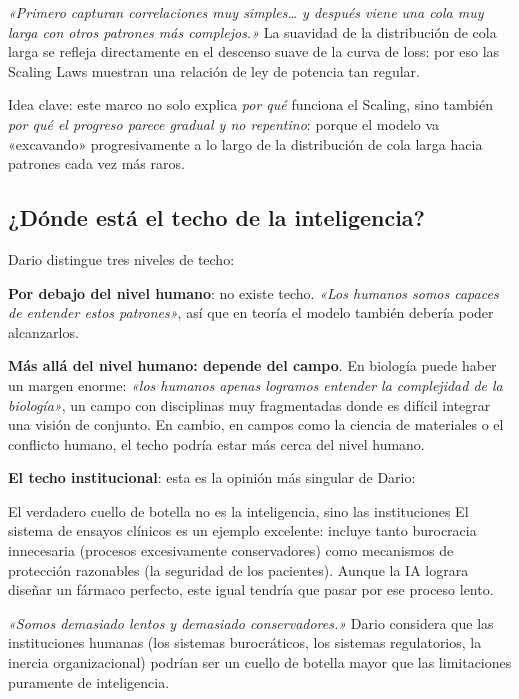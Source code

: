 \documentclass[a4paper]{article}
\begin{document}
\textit{«Primero capturan correlaciones muy simples… y después viene una cola muy larga con otros patrones más complejos.»} La suavidad de la distribución de cola larga se refleja directamente en el descenso suave de la curva de loss: por eso las Scaling Laws muestran una relación de ley de potencia tan regular.

Idea clave: este marco no solo explica \textit{por qué} funciona el Scaling, sino también \textit{por qué el progreso parece gradual y no repentino}: porque el modelo va «excavando» progresivamente a lo largo de la distribución de cola larga hacia patrones cada vez más raros.

\subsection{¿Dónde está el techo de la inteligencia?}

Dario distingue tres niveles de techo:

\textbf{Por debajo del nivel humano}: no existe techo. \textit{«Los humanos somos capaces de entender estos patrones»}, así que en teoría el modelo también debería poder alcanzarlos.

\textbf{Más allá del nivel humano: depende del campo}. En biología puede haber un margen enorme: \textit{«los humanos apenas logramos entender la complejidad de la biología»}, un campo con disciplinas muy fragmentadas donde es difícil integrar una visión de conjunto. En cambio, en campos como la ciencia de materiales o el conflicto humano, el techo podría estar más cerca del nivel humano.

\textbf{El techo institucional}: esta es la opinión más singular de Dario:

\begin{warningbox}{El verdadero cuello de botella no es la inteligencia, sino las instituciones}
El sistema de ensayos clínicos es un ejemplo excelente: incluye tanto burocracia innecesaria (procesos excesivamente conservadores) como mecanismos de protección razonables (la seguridad de los pacientes). Aunque la IA lograra diseñar un fármaco perfecto, este igual tendría que pasar por ese proceso lento.

\textit{«Somos demasiado lentos y demasiado conservadores.»} Dario considera que las instituciones humanas (los sistemas burocráticos, los sistemas regulatorios, la inercia organizacional) podrían ser un cuello de botella mayor que las limitaciones puramente de inteligencia.
\end{warningbox}
\end{document}
